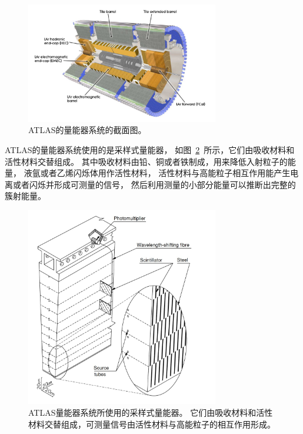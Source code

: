 \begin{figure}
  \begin{center}
    \includegraphics[width=0.75\textwidth]{figuresEXP/ATLASCA1.jpg}
  \end{center}
  \caption{
ATLAS的量能器系统的截面图。
  }
    \label{fig:ATLASCA1}
\end{figure}

ATLAS的量能器系统使用的是采样式量能器，
如图~\ref{fig:ATLASCA2}~所示，它们由吸收材料和活性材料交替组成。
其中吸收材料由铅、铜或者铁制成，用来降低入射粒子的能量，
液氩或者乙烯闪烁体用作活性材料，
活性材料与高能粒子相互作用能产生电离或者闪烁并形成可测量的信号，
然后利用测量的小部分能量可以推断出完整的簇射能量。

\begin{figure}
  \begin{center}
    \includegraphics[width=0.75\textwidth]{figuresEXP/ATLASCA2.jpg}
  \end{center}
  \caption{
ATLAS量能器系统所使用的采样式量能器。
它们由吸收材料和活性材料交替组成，可测量信号由活性材料与高能粒子的相互作用形成。
  }
    \label{fig:ATLASCA2}
\end{figure}

